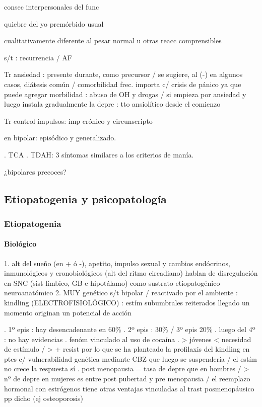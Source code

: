 \documentclass{scrbook}
\begin{document}
consec interpersonales del func

quiebre del yo premórbido usual

cualitativamente diferente al pesar normal u otras reacc comprensibles

s/t : recurrencia / AF

Tr ansiedad : presente durante, como precursor / se sugiere, al (-) en algunos casos, diátesis común / comorbilidad frec. importa c/ crisis de pánico ya que puede agregar morbilidad : abuso de OH y drogas / si empieza por ansiedad y luego instala gradualmente la depre : tto ansiolítico desde el comienzo

Tr control impulsos: imp crónico y circunscripto

en bipolar: episódico y generalizado.

. TCA
. TDAH: 3 síntomas similares a los criterios de  manía.

¿bipolares precoces?

\subsection*{Etiopatogenia y psicopatología}
\subsubsection*{Etiopatogenia}
\paragraph{Biológico}

1. alt del sueño (en + ó -), apetito, impulso sexual y cambios endócrinos, inmunológicos y cronobiológicos (alt del ritmo circadiano) hablan de disregulación en SNC (sist límbico, GB e hipotálamo) como sustrato etiopatogénico neuroanatómico
2. MUY genético s/t bipolar / reactivado por el ambiente : kindling (ELECTROFISIOLÓGICO) : estím subumbrales reiterados llegado un momento originan un potencial de acción

. 1º epis : hay desencadenante en 60\%
. 2º epis : 30\% / 3º epis 20\%
. luego del 4º : no hay evidencias
. fenóm vinculado al uso de cocaína
. > jóvenes < necesidad de estímulo / > + resist por lo que se ha planteado la profilaxis del kindling en ptes c/ vulnerabilidad genética mediante CBZ que luego se suspendería / el estím no crece la respuesta sí
. post menopausia = tasa de depre que en hombres / > nº de depre en mujeres es entre post pubertad y pre menopausia / el reemplazo hormonal con estrógenos tiene otras ventajas vinculadas al trast posmenopáusico pp dicho (ej osteoporosis)
\end{document}

